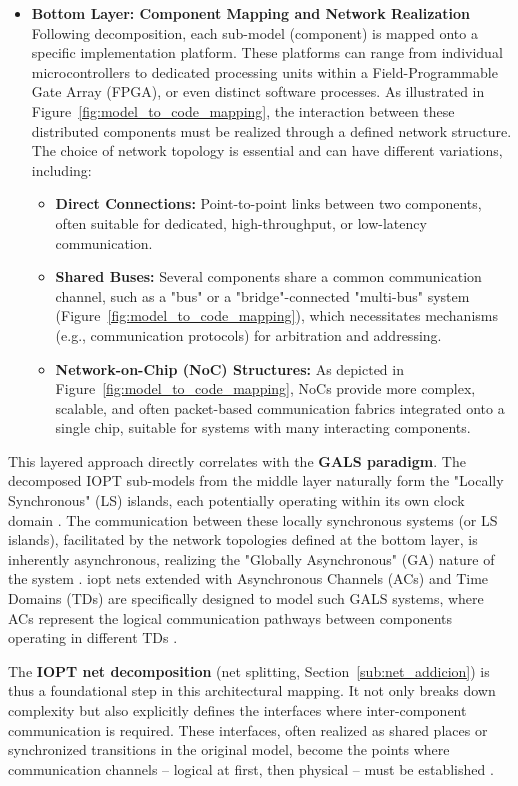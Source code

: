 \begin{itemize}
    \item \textbf{Bottom Layer: Component Mapping and Network Realization} \\
    Following decomposition, each sub-model (component) is mapped onto a specific implementation platform. These platforms can range from individual microcontrollers to dedicated processing units within a Field-Programmable Gate Array (FPGA), or even distinct software processes. As illustrated in Figure~\ref{fig:model_to_code_mapping}, the interaction between these distributed components must be realized through a defined network structure. The choice of network topology is essential and can have different variations, including:
    \begin{itemize}
        \item \textbf{Direct Connections:} Point-to-point links between two components, often suitable for dedicated, high-throughput, or low-latency communication.
        \item \textbf{Shared Buses:} Several components share a common communication channel, such as a "bus" or a "bridge"-connected "multi-bus" system (Figure~\ref{fig:model_to_code_mapping}), which necessitates mechanisms (e.g., communication protocols) for arbitration and addressing.
        \item \textbf{Network-on-Chip (NoC) Structures:} As depicted in Figure~\ref{fig:model_to_code_mapping}, NoCs provide more complex, scalable, and often packet-based communication fabrics integrated onto a single chip, suitable for systems with many interacting components.
    \end{itemize}
\end{itemize}

This layered approach directly correlates with the \textbf{GALS paradigm}. The decomposed IOPT sub-models from the middle layer naturally form the "Locally Synchronous" (LS) islands, each potentially operating within its own clock domain \cite{galsactd}. The communication between these locally  synchronous systems (or LS islands), facilitated by the network topologies defined at the bottom layer, is inherently asynchronous, realizing the "Globally Asynchronous" (GA) nature of the system \cite{galsborman}. \gls{iopt} nets extended with Asynchronous Channels (ACs) and Time Domains (TDs) are specifically designed to model such GALS systems, where ACs represent the logical communication pathways between components operating in different TDs \cite{galsactd, iopttools}.

The \textbf{IOPT net decomposition} (net splitting, Section~\ref{sub:net_addicion}) is thus a foundational step in this architectural mapping. It not only breaks down complexity but also explicitly defines the interfaces where inter-component communication is required. These interfaces, often realized as shared places or synchronized transitions in the original model, become the points where communication channels – logical at first, then physical – must be established \cite{Barrosadd}.

